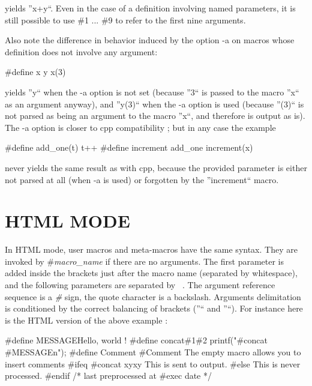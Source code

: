 yields ''x+y``. Even in the case of a definition involving named parameters,
it is still possible to use \#1 ... \#9 to refer to the first nine arguments. 

Also note the difference in behavior induced by the option -a on macros whose
definition does not involve any argument: 

\begin{PRE}
    \#define x y
    x(3)
\end{PRE}

yields ''y`` when the -a option is not set (because ''3`` is passed to the
macro ''x`` as an argument anyway), and ''y(3)`` when the -a option is used
(because ''(3)`` is not parsed as being an argument to the macro ''x``, and
therefore is output as is). The -a option is closer to cpp compatibility ; but
in any case the example 

\begin{PRE}
    \#define add\_one(t) t++
    \#define increment add\_one
    increment(x)
\end{PRE}

never yields the same result as with cpp, because the provided parameter is
either not parsed at all (when -a is used) or forgotten by the ''increment``
macro. 

\htmlHR

\section{HTML MODE}

In HTML mode, user macros and meta-macros have the same syntax. They are
invoked by {\htmlLt}\#{\it macro\_name}{\htmlGt} if there are no arguments.
The first parameter is added inside the brackets just after the macro name
(separated by whitespace), and the following parameters are separated by {\tt
{\htmlBar}}. The argument reference sequence is a {\it \#} sign, the quote
character is a backslash. Arguments delimitation is conditioned by the correct
balancing of brackets (''{\it {\htmlLt}}`` and ''{\it {\htmlGt}}``). For
instance here is the HTML version of the above example : 

\begin{PRE}
   {\htmlLt}\#define MESSAGE{\htmlBar}Hello, world !{\htmlGt}
   {\htmlLt}\#define concat{\htmlBar}\#1\#2{\htmlGt}
   printf("{\htmlLt}\#concat {\htmlLt}\#MESSAGE{\htmlGt}{\htmlBar}{\htmlBackslash}n{\htmlGt}");
   {\htmlLt}\#define Comment{\htmlGt}
   {\htmlLt}\#Comment The empty macro allows you to insert comments{\htmlGt}
   {\htmlLt}\#ifeq {\htmlLt}\#concat x{\htmlBar}y{\htmlGt}{\htmlBar}xy{\htmlGt}
   This is sent to output.
   {\htmlLt}\#else{\htmlGt}
   This is never processed.
   {\htmlLt}\#endif{\htmlGt}
   /* last preprocessed at {\htmlLt}\#exec date{\htmlGt} */
\end{PRE}

